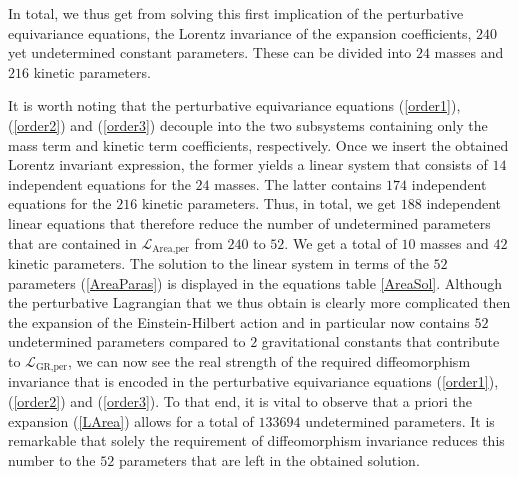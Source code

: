 In total, we thus get from solving this first implication of the perturbative equivariance equations, the Lorentz invariance of the expansion coefficients, $240$ yet undetermined constant parameters. These can be divided into $24$ masses and $216$ kinetic parameters.

It is worth noting that the perturbative equivariance equations (\ref{order1}), (\ref{order2}) and (\ref{order3}) decouple into the two subsystems containing only the mass term and kinetic term coefficients, respectively. Once we insert the obtained Lorentz invariant expression, the former yields a linear system that consists of $14$ independent equations for the $24$ masses. The latter contains $174$ independent equations for the $216$ kinetic parameters. Thus, in total, we get $188$ independent linear equations that therefore reduce the number of undetermined parameters that are contained in $\mathcal{L}_{\text{Area,per}}$ from $240$ to $52$. We get a total of $10$ masses and $42$ kinetic parameters. The solution to the linear system in terms of the $52$ parameters (\ref{AreaParas}) is displayed in the equations table \ref{AreaSol}. Although the perturbative Lagrangian that we thus obtain is clearly more complicated then the expansion of the Einstein-Hilbert action and in particular now contains $52$ undetermined parameters compared to $2$ gravitational constants that contribute to $\mathcal{L}_{\text{GR,per}}$, we can now see the real strength of the required diffeomorphism invariance that is encoded in the perturbative equivariance equations (\ref{order1}), (\ref{order2}) and (\ref{order3}). To that end, it is vital to observe that a priori the expansion (\ref{LArea}) allows for a total of $133694$ undetermined parameters. It is remarkable that solely the requirement of diffeomorphism invariance reduces this number to the $52$ parameters that are left in the obtained solution. 

